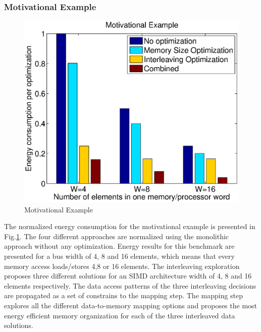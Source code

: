 \documentclass[prodmode,acmtecs]{acmsmall}
\begin{document}
\subsubsection{Motivational Example}

\begin{figure}
\centering
	\includegraphics[scale = 0.5]{Images/Example.eps} 
	\caption{Motivational Example}
	\label{fig:example}
\end{figure}

The normalized energy consumption for the motivational example is presented in Fig.\ref{fig:example}.
The four different approaches are normalized using the monolithic approach without any optimization.
Energy results for this benchmark are presented for a bus width of 4, 8 and 16 elements, which means that every memory access loads/stores 4,8 or 16 elements. 
The interleaving exploration proposes three different solutions for an SIMD architecture width of 4, 8 and 16 elements respectively.
The data access patterns of the three interleaving decisions are propagated as a set of constrains to the mapping step.
The mapping step explores all the different data-to-memory mapping options and proposes the most energy efficient memory organization for each of the three interleaved data solutions.
\end{document}

